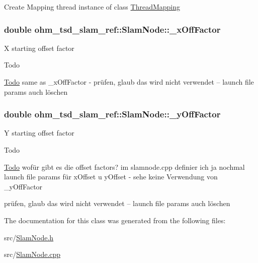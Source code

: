 Create Mapping thread instance of class \hyperlink{classohm__tsd__slam__ref_1_1ThreadMapping}{Thread\-Mapping} \hypertarget{classohm__tsd__slam__ref_1_1SlamNode_ad57ec9810293549dc803209a950a776f}{
\subsubsection[{\-\_\-x\-Off\-Factor}]{\setlength{\rightskip}{0pt plus 5cm}double ohm\-\_\-tsd\-\_\-slam\-\_\-ref\-::\-Slam\-Node\-::\-\_\-x\-Off\-Factor\hspace{0.3cm}{\ttfamily [private]}}}\label{classohm__tsd__slam__ref_1_1SlamNode_ad57ec9810293549dc803209a950a776f}
X starting offset factor \begin{DoxyRefDesc}{Todo}
\item[\hyperlink{todo__todo000011}{Todo}]same as \-\_\-x\-Off\-Factor -\/ prüfen, glaub das wird nicht verwendet -- launch file params auch löschen \end{DoxyRefDesc}
\hypertarget{classohm__tsd__slam__ref_1_1SlamNode_a591fdd2fc92e9fd53112b36f0125cf51}{
\subsubsection[{\-\_\-y\-Off\-Factor}]{\setlength{\rightskip}{0pt plus 5cm}double ohm\-\_\-tsd\-\_\-slam\-\_\-ref\-::\-Slam\-Node\-::\-\_\-y\-Off\-Factor\hspace{0.3cm}{\ttfamily [private]}}}\label{classohm__tsd__slam__ref_1_1SlamNode_a591fdd2fc92e9fd53112b36f0125cf51}
Y starting offset factor \begin{DoxyRefDesc}{Todo}
\item[\hyperlink{todo__todo000012}{Todo}]wofür gibt es die offset factors? im slamnode.\-cpp definier ich ja nochmal launch file params für x\-Offset u y\-Offset -\/ sehe keine Verwendung von \-\_\-y\-Off\-Factor 

prüfen, glaub das wird nicht verwendet -- launch file params auch löschen \end{DoxyRefDesc}


The documentation for this class was generated from the following files\-:\begin{DoxyCompactItemize}
\item 
src/\hyperlink{SlamNode_8h}{Slam\-Node.\-h}\item 
src/\hyperlink{SlamNode_8cpp}{Slam\-Node.\-cpp}\end{DoxyCompactItemize}
